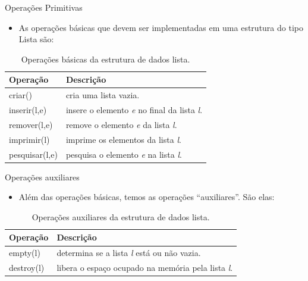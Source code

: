 \begin{frame}{Operações Primitivas}
  \begin{itemize}
	  \item As operações básicas que devem ser implementadas em uma estrutura do tipo Lista são:		
  \end{itemize}
  \begin{table}[!htpb]
			  \centering
						\begin{tabular}{l|l}
						    \hline \textbf{Operação} & \textbf{Descrição} \\
						    \hline criar() & cria uma lista vazia.\\
						    \hline inserir(l,e) & insere o elemento \textit{e} no final da lista \textit{l}.\\
						    \hline remover(l,e) & remove o elemento \textit{e} da lista \textit{l}.\\
						    \hline imprimir(l) & imprime os elementos da lista \textit{l}.\\
						    \hline pesquisar(l,e) & pesquisa o elemento \textit{e} na lista \textit{l}.\\
						    \hline 
						\end{tabular}
						\caption{Operações básicas da estrutura de dados lista.}
				\end{table}
\end{frame}
 
\begin{frame}{Operações auxiliares}   
			\begin{itemize}
				\item Além das operações básicas, temos as operações ``auxiliares''. São elas:
			\end{itemize}
			\begin{table}[!htpb]
			  \centering
						\begin{tabular}{l|l}
						    \hline \textbf{Operação} & \textbf{Descrição} \\						    
						    \hline empty(l) & determina se a lista \textit{l} está ou não vazia.\\
						    \hline destroy(l) & libera o espaço ocupado na memória pela lista \textit{l}.\\
						    \hline 
						\end{tabular}
						\caption{Operações auxiliares da estrutura de dados lista.}
				\end{table}
  \end{frame}


